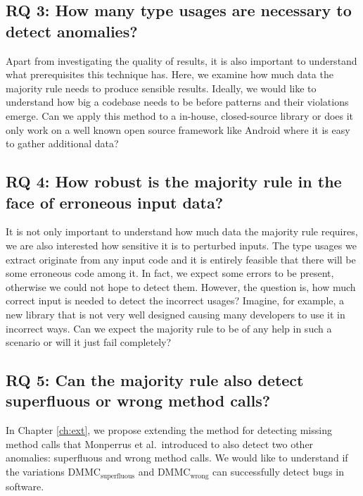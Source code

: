 \subsection{RQ 3: How many type usages are necessary to detect anomalies?}

Apart from investigating the quality of results, it is also important to understand what prerequisites this technique has.
Here, we examine how much data the majority rule needs to produce sensible results.
Ideally, we would like to understand how big a codebase needs to be before patterns and their violations emerge.
Can we apply this method to a in-house, closed-source library or does it only work on a well known open source framework like Android where it is easy to gather additional data?

\subsection{RQ 4: How robust is the majority rule in the face of erroneous input data?}

It is not only important to understand how much data the majority rule requires, we are also interested how sensitive it is to perturbed inputs.
The type usages we extract originate from any input code and it is entirely feasible that there will be some erroneous code among it.
In fact, we expect some errors to be present, otherwise we could not hope to detect them.
However, the question is, how much correct input is needed to detect the incorrect usages?
Imagine, for example, a new library that is not very well designed causing many developers to use it in incorrect ways.
Can we expect the majority rule to be of any help in such a scenario or will it just fail completely?

\subsection{RQ 5: Can the majority rule also detect superfluous or wrong method calls?}

In Chapter \ref{ch:ext}, we propose extending the method for detecting missing method calls that Monperrus et al.\ introduced to also detect two other anomalies: superfluous and wrong method calls.
We would like to understand if the variations $\text{DMMC}_\text{superfluous}$ and $\text{DMMC}_\text{wrong}$ can successfully detect bugs in software.

